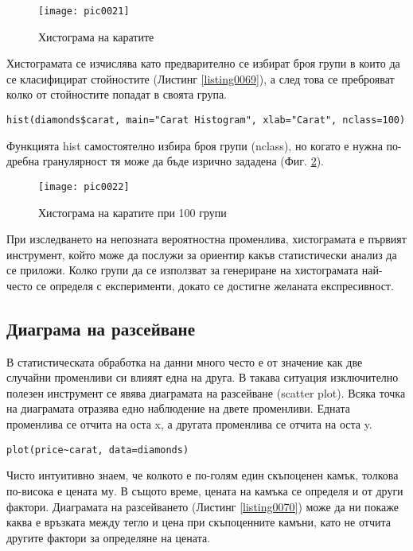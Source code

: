 \begin{figure}[h!]
  \centering
  \texttt{[image: pic0021]}
  \caption{Хистограма на каратите}
\label{figure0021}
\end{figure}
\FloatBarrier

Хистограмата се изчислява като предварително се избират броя групи в които да се класифицират стойностите (Листинг \ref{listing0069}), а след това се преброяват колко от стойностите попадат в своята група. 

\begin{lstlisting}[caption=Хистограма с повече групи, label=listing0069]
hist(diamonds$carat, main="Carat Histogram", xlab="Carat", nclass=100)
\end{lstlisting}

Функцията hist самостоятелно избира броя групи (nclass), но когато е нужна по-дребна гранулярност тя може да бъде изрично зададена (Фиг. \ref{figure0022}).

\begin{figure}[h!]
  \centering
  \texttt{[image: pic0022]}
  \caption{Хистограма на каратите при 100 групи}
\label{figure0022}
\end{figure}
\FloatBarrier

При изследването на непозната вероятностна променлива, хистограмата е първият инструмент, който може да послужи за ориентир какъв статистически анализ да се приложи. Колко групи да се използват за генериране на хистограмата най-често се определя с експерименти, докато се достигне желаната експресивност. 

\subsection{Диаграма на разсейване}

В статистическата обработка на данни много често е от значение как две случайни променливи си влияят една на друга. В такава ситуация изключително полезен инструмент се явява диаграмата на разсейване (scatter plot). Всяка точка на диаграмата отразява едно наблюдение на двете променливи. Едната променлива се отчита на оста x, а другата променлива се отчита на оста y. 

\begin{lstlisting}[caption=Генериране на диаграма на разсейване, label=listing0070]
plot(price~carat, data=diamonds)
\end{lstlisting}

Чисто интуитивно знаем, че колкото е по-голям един скъпоценен камък, толкова по-висока е цената му. В същото време, цената на камъка се определя и от други фактори. Диаграмата на разсейването (Листинг \ref{listing0070}) може да ни покаже каква е връзката между тегло и цена при скъпоценните камъни, като не отчита другите фактори за определяне на цената.

